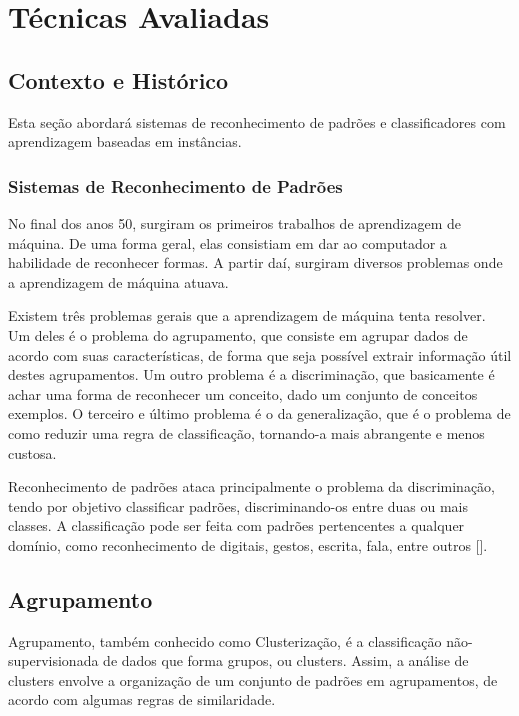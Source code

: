 \chapter{Técnicas Avaliadas}
\label{ch:ch2}

\section{Contexto e Histórico}
\label{sec:contexto}

Esta seção abordará sistemas de reconhecimento de padrões e classificadores com aprendizagem baseadas em instâncias.

\subsection{Sistemas de Reconhecimento de Padrões}
\label{subsec:sistemas}

No final dos anos 50, surgiram os primeiros trabalhos de aprendizagem de máquina. De uma forma geral, elas consistiam em dar ao computador a habilidade de reconhecer formas. A partir daí, surgiram diversos problemas onde a aprendizagem de máquina atuava. 

Existem três problemas gerais que a aprendizagem de máquina tenta resolver. Um deles é o problema do agrupamento, que consiste em agrupar dados de acordo com suas características, de forma que seja possível extrair informação útil destes agrupamentos. Um outro problema é a discriminação, que basicamente é achar uma forma de reconhecer um conceito, dado um conjunto de conceitos exemplos. O terceiro e último problema é o da generalização, que é o problema de como reduzir uma regra de classificação, tornando-a mais abrangente e menos custosa.

Reconhecimento de padrões ataca principalmente o problema da discriminação, tendo por objetivo classificar padrões, discriminando-os entre duas ou mais classes. A classificação pode ser feita com padrões pertencentes a qualquer domínio, como reconhecimento de digitais, gestos, escrita, fala, entre outros [\cite{dvro:tg}].

\section{Agrupamento}

Agrupamento, também conhecido como Clusterização, é a classificação não-supervisionada de dados que forma grupos, ou clusters. Assim, a análise de clusters envolve a organização de um conjunto de padrões em agrupamentos, de acordo com algumas regras de similaridade.

